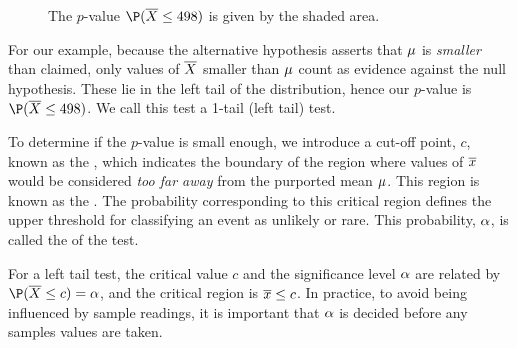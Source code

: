 \begin{figure}[H]
    \centering
    \caption{The $p$-value $\P(\ol{X} \leq 498)$ is given by the shaded area.}
\end{figure}

For our example, because the alternative hypothesis asserts that $\mu$ is \emph{smaller} than claimed, only values of $\overline{X}$ smaller than $\mu$ count as evidence against the null hypothesis. These lie in the left tail of the distribution, hence our $p$-value is $\P(\ol{X} \leq 498)$. We call this test a 1-tail (left tail) test.

To determine if the $p$-value is small enough, we introduce a cut-off point, $c$, known as the , which indicates the boundary of the region where values of $\overline{x}$ would be considered \emph{too far away} from the purported mean $\mu$. This region is known as the . The probability corresponding to this critical region defines the upper threshold for classifying an event as unlikely or rare. This probability, $\alpha$, is called the  of the test.

For a left tail test, the critical value $c$ and the significance level $\alpha$ are related by $\P(\ol{X} \leq c) = \a$, and the critical region is $\overline{x} \leq c$. In practice, to avoid being influenced by sample readings, it is important that $\alpha$ is decided before any samples values are taken.

